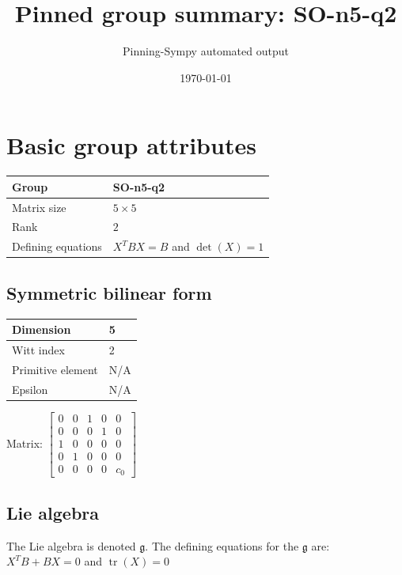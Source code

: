 \documentclass[11pt]{article}
\title{Pinned group summary: SO-n5-q2}
\author{Pinning-Sympy automated output}
\date{\today}
\newcommand{\frakg}{\mathfrak{g}}
\theoremstyle{definition}
\begin{document}
\maketitle
\tableofcontents

\newpage

\section{Basic group attributes}

\def\arraystretch{1.2}
\begin{tabular}{|l|l|}
	\hline
    Group & SO-n5-q2 \\
	\hline
    Matrix size & $5 \times 5$ \\
	\hline
    Rank & $2$ \\
	\hline
	Defining equations & $X^TBX = B$ and $\operatorname{det}(X)=1$ \\
	\hline
\end{tabular}
\def\arraystretch{1}

\subsection{Symmetric bilinear form}
\begin{tabular}{|l|l|}
    \hline
    Dimension & 5 \\
    \hline
    Witt index & 2 \\
    \hline
    Primitive element & N/A \\
    \hline
    Epsilon & N/A \\
    \hline
\end{tabular}

\bigskip
\noindent Matrix: \(
\left[\begin{matrix}0 & 0 & 1 & 0 & 0\\0 & 0 & 0 & 1 & 0\\1 & 0 & 0 & 0 & 0\\0 & 1 & 0 & 0 & 0\\0 & 0 & 0 & 0 & c_{0}\end{matrix}\right]
\)



\subsection{Lie algebra}

The Lie algebra is denoted $\frakg$. The defining equations for the $\frakg$ are: $X^TB + BX = 0$ and $\operatorname{tr}(X)=0$
\end{document}
